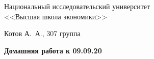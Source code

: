\thispagestyle{empty}
\begin{center}
\large{Национальный исследовательский университет \\ <<Высшая школа экономики>>}

\vspace{4cm}
Котов А.~А., 307 группа\par
\vspace{0.5cm}
\textbf{\large{Домашняя работа к 09.09.20}}
\end{center}
\vspace{6cm}

\newpage
\restoregeometry